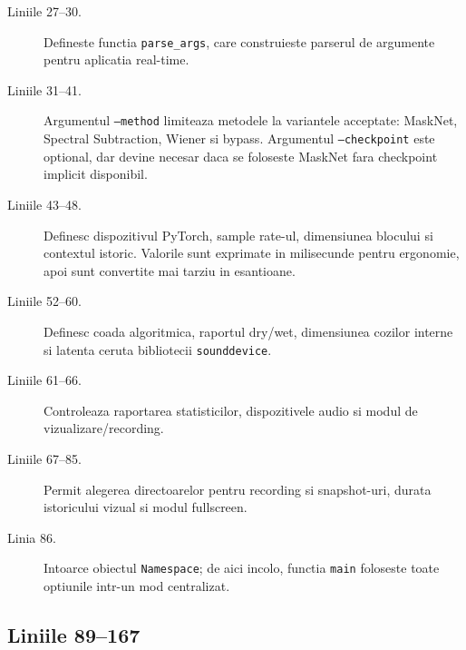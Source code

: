 \documentclass[12pt,a4paper]{report}
\newcommand{\chunk}[3]{\subsection*{Liniile #2--#3}}
\begin{document}
\begin{description}
    \item[Liniile 27--30.] Defineste functia \texttt{parse\_args}, care construieste
    parserul de argumente pentru aplicatia real-time.
    \item[Liniile 31--41.] Argumentul \texttt{--method} limiteaza metodele la
    variantele acceptate: MaskNet, Spectral Subtraction, Wiener si bypass.
    Argumentul \texttt{--checkpoint} este optional, dar devine necesar daca se
    foloseste MaskNet fara checkpoint implicit disponibil.
    \item[Liniile 43--48.] Definesc dispozitivul PyTorch, sample rate-ul,
    dimensiunea blocului si contextul istoric. Valorile sunt exprimate in
    milisecunde pentru ergonomie, apoi sunt convertite mai tarziu in esantioane.
    \item[Liniile 52--60.] Definesc coada algoritmica, raportul dry/wet,
    dimensiunea cozilor interne si latenta ceruta bibliotecii \texttt{sounddevice}.
    \item[Liniile 61--66.] Controleaza raportarea statisticilor, dispozitivele
    audio si modul de vizualizare/recording.
    \item[Liniile 67--85.] Permit alegerea directoarelor pentru recording si
    snapshot-uri, durata istoricului vizual si modul fullscreen.
    \item[Linia 86.] Intoarce obiectul \texttt{Namespace}; de aici incolo,
    functia \texttt{main} foloseste toate optiunile intr-un mod centralizat.
\end{description}

\chunk{../src/tools/realtime_demo.py}{89}{167}
\end{document}
